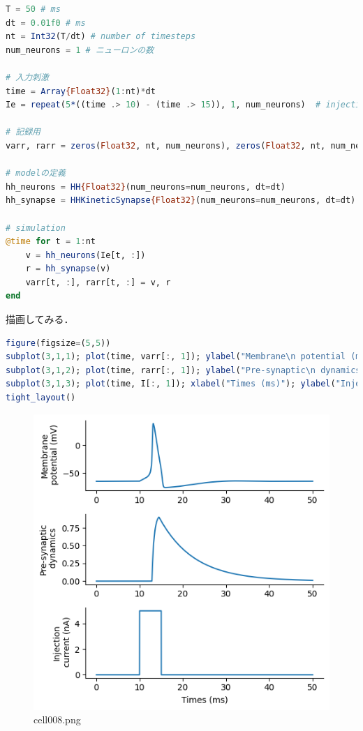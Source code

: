 \begin{lstlisting}[language=julia]
T = 50 # ms
dt = 0.01f0 # ms
nt = Int32(T/dt) # number of timesteps
num_neurons = 1 # ニューロンの数

# 入力刺激
time = Array{Float32}(1:nt)*dt
Ie = repeat(5*((time .> 10) - (time .> 15)), 1, num_neurons)  # injection current

# 記録用
varr, rarr = zeros(Float32, nt, num_neurons), zeros(Float32, nt, num_neurons)

# modelの定義
hh_neurons = HH{Float32}(num_neurons=num_neurons, dt=dt)
hh_synapse = HHKineticSynapse{Float32}(num_neurons=num_neurons, dt=dt)

# simulation
@time for t = 1:nt
    v = hh_neurons(Ie[t, :])
    r = hh_synapse(v)
    varr[t, :], rarr[t, :] = v, r
end
\end{lstlisting}
描画してみる．
\begin{lstlisting}[language=julia]
figure(figsize=(5,5))
subplot(3,1,1); plot(time, varr[:, 1]); ylabel("Membrane\n potential (mV)")
subplot(3,1,2); plot(time, rarr[:, 1]); ylabel("Pre-synaptic\n dynamics")
subplot(3,1,3); plot(time, I[:, 1]); xlabel("Times (ms)"); ylabel("Injection\n current (nA)")
tight_layout()
\end{lstlisting}
\begin{figure}[ht]
	\centering
	\includegraphics[scale=0.8, max width=\linewidth]{./fig/synapse-model/kinetic-synapse/cell008.png}
	\caption{cell008.png}
	\label{cell008.png}
\end{figure}
